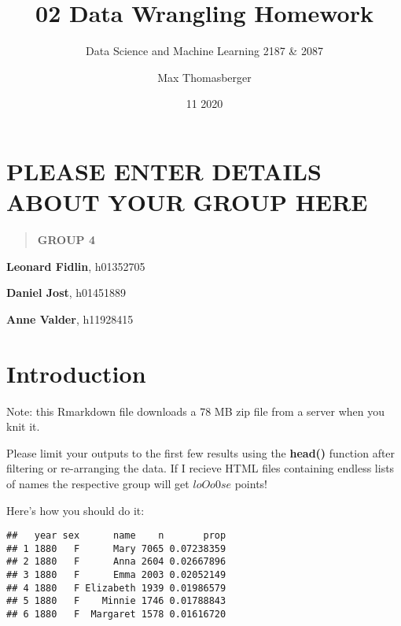\documentclass[
]{article}
\title{02 Data Wrangling Homework}
\subtitle{Data Science and Machine Learning 2187 \& 2087}
\author{Max Thomasberger}
\date{11 2020}
\newenvironment{Shaded}{\begin{snugshade}}{\end{snugshade}}
\newcommand{\CommentTok}[1]{\textcolor[rgb]{0.56,0.35,0.01}{\textit{#1}}}
\newcommand{\KeywordTok}[1]{\textcolor[rgb]{0.13,0.29,0.53}{\textbf{#1}}}
\newcommand{\NormalTok}[1]{#1}
\newcommand{\OperatorTok}[1]{\textcolor[rgb]{0.81,0.36,0.00}{\textbf{#1}}}
\newcommand{\StringTok}[1]{\textcolor[rgb]{0.31,0.60,0.02}{#1}}
\begin{document}
\maketitle

{
\setcounter{tocdepth}{2}
\tableofcontents
}
\hypertarget{please-enter-details-about-your-group-here}{%
\section{PLEASE ENTER DETAILS ABOUT YOUR GROUP
HERE}\label{please-enter-details-about-your-group-here}}

\begin{quote}
\textbf{GROUP 4}
\end{quote}

\textbf{Leonard Fidlin}, h01352705

\textbf{Daniel Jost}, h01451889

\textbf{Anne Valder}, h11928415

\hypertarget{introduction}{%
\section{Introduction}\label{introduction}}

Note: this Rmarkdown file downloads a 78 MB zip file from a server when
you knit it.

Please limit your outputs to the first few results using the
\textbf{head()} function after filtering or re-arranging the data. If I
recieve HTML files containing endless lists of names the respective
group will get \(l o O o 0 s e\) points!

Here's how you should do it:

\begin{Shaded}
\end{Shaded}

\begin{verbatim}
##   year sex      name    n       prop
## 1 1880   F      Mary 7065 0.07238359
## 2 1880   F      Anna 2604 0.02667896
## 3 1880   F      Emma 2003 0.02052149
## 4 1880   F Elizabeth 1939 0.01986579
## 5 1880   F    Minnie 1746 0.01788843
## 6 1880   F  Margaret 1578 0.01616720
\end{verbatim}
\end{document}
